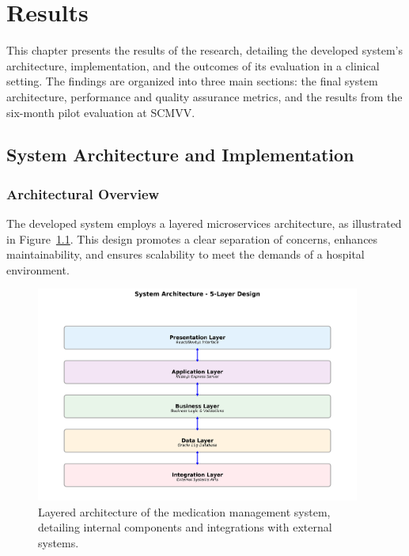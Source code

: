 \chapter{Results}

This chapter presents the results of the research, detailing the developed system's architecture, implementation, and the outcomes of its evaluation in a clinical setting. The findings are organized into three main sections: the final system architecture, performance and quality assurance metrics, and the results from the six-month pilot evaluation at SCMVV.

\section{System Architecture and Implementation}

\subsection{Architectural Overview}

The developed system employs a layered microservices architecture, as illustrated in Figure~\ref{fig:architecture}. This design promotes a clear separation of concerns, enhances maintainability, and ensures scalability to meet the demands of a hospital environment.

\begin{figure}[htbp]
    \centering
    \includegraphics[width=0.95\textwidth]{images/generated/system_architecture.png}
    \caption{Layered architecture of the medication management system, detailing internal components and integrations with external systems.}
    \label{fig:architecture}
\end{figure}

